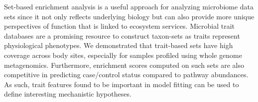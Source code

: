 Set-based enrichment analysis is a useful approach for analyzing microbiome data sets since it not only reflects underlying biology but can also provide more unique perspectives of function that is linked to ecosystem services. Microbial trait databases are a promising resource to construct taxon-sets as traits represent physiological phenotypes. We demonstrated that trait-based sets have high coverage across body sites, especially for samples profiled using whole genome metagenomics. Furthermore, enrichment scores computed on such sets are also competitive in predicting case/control status compared to pathway abundances. As such, trait features found to be important in model fitting can be used to define interesting mechanistic hypotheses. 





